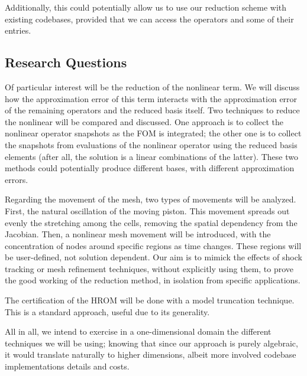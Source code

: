 Additionally, this could potentially allow us to use our reduction scheme with existing codebases,
provided that we can access the operators and some of their entries. 

\subsection{Research Questions}
Of particular interest will be the reduction of the nonlinear term.
We will discuss how the approximation error of this term interacts with 
the approximation error of the remaining operators and the reduced basis itself.
Two techniques to reduce the nonlinear will be compared and discussed.
One approach is to collect the nonlinear operator snapshots as the FOM is integrated;
the other one is to collect the snapshots from evaluations of the nonlinear operator
using the reduced basis elements 
(after all, the solution is a linear combinations of the latter). 
These two methods could potentially produce different bases, 
with different approximation errors. 

Regarding the movement of the mesh, two types of movements will be analyzed.
First, the natural oscillation of the moving piston.
This movement spreads out evenly the stretching among the cells, 
removing the spatial dependency from the Jacobian.
Then, a nonlinear mesh movement will be introduced, 
with the concentration of nodes around specific regions as time changes.
These regions will be user-defined, not solution dependent.
Our aim is to mimick the effects of shock tracking or mesh refinement techniques, 
without explicitly using them, to prove the good working of the reduction
method, in isolation from specific applications. 

The certification of the HROM will be done with a model truncation technique.
This is a standard approach, useful due to its generality.

All in all, we intend to exercise in a one-dimensional domain
the different techniques we will be using;
knowing that since our approach is purely algebraic, 
it would translate naturally to higher dimensions,
albeit more involved codebase implementations details and costs.


